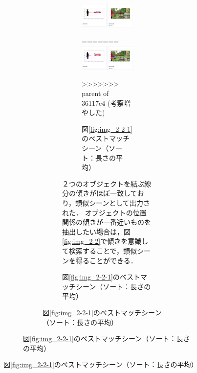 \documentclass[a4j,12pt,dvipdfmx]{jreport}
\begin{document}
\begin{figure}[H]
\begin{figure}[H]
\begin{figure}[H]
\begin{figure}[H]
\begin{figure}[H]
  \centering
  \includegraphics[width=13cm]{image/result_2_3_1.jpg}
  \caption{図\ref{fig:img_2_2_1}のベストマッチシーン（ソート：図形の傾き）}
  \label{fig:img_2_3_1}
=======
  \includegraphics[width=13cm]{image/result_2_2_3.jpg}
  \caption{図\ref{fig:img_2-2-1}のベストマッチシーン（ソート：長さの平均）}
  \label{fig:img_2-2-3}
>>>>>>> parent of 36117c4 (考察増やした)
\end{figure}

２つのオブジェクトを結ぶ線分の傾きがほぼ一致しており，類似シーンとして出力された．
オブジェクトの位置関係の傾きが一番近いものを抽出したい場合は，図\ref{fig:img_2-2}で傾きを意識して検索することで，類似シーンを得ることができる．


\end{figure}
\end{figure}
\end{figure}
\end{figure}
\end{document}
